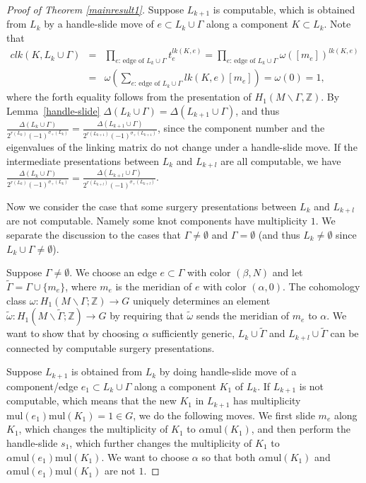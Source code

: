 \documentclass[12pt]{amsart}
\begin{document}
\begin{proof}[Proof of Theorem \ref{mainresult1}]
Suppose $L_{k+1}$ is computable, which is obtained from $L_k$ by a handle-slide move of $e\subset L_k\cup \Gamma$ along a component $K\subset L_k$. Note that 
\begin{eqnarray*}
\displaystyle clk(K, L_k\cup \Gamma)&=&\prod_{\text{$e$: edge of $L_k\cup \Gamma$}} t_e^{lk(K, e)}=\prod_{\text{$e$: edge of $L_k\cup \Gamma$}} \omega ([m_e])^{lk(K, e)}\\&=&\omega\left (\sum_{\text{$e$: edge of $L_k\cup \Gamma$}} lk(K, e) [m_e]\right )=\omega (0)=1,
\end{eqnarray*}
where the forth equality follows from the presentation of $H_1(M\backslash \Gamma, \mathbb{Z})$. By Lemma~\ref{handle-slide} $\Delta (L_k\cup \Gamma)=\Delta (L_{k+1}\cup \Gamma)$, and thus $\frac{\Delta (L_k\cup \Gamma)}{2^{r(L_k)}(-1)^{\sigma_+(L_k)}}=\frac{\Delta (L_{k+1}\cup \Gamma)}{2^{r(L_{k+1})}(-1)^{\sigma_+(L_{k+1})}}$, since the component number and the eigenvalues of the linking matrix do not change under a handle-slide move.
If the intermediate presentations between $L_k$ and $L_{k+l}$ are all computable, we have $\frac{\Delta (L_k\cup \Gamma)}{2^{r(L_k)}(-1)^{\sigma_+(L_k)}}=\frac{\Delta (L_{k+l}\cup \Gamma)}{2^{r(L_{k+l})}(-1)^{\sigma_+(L_{k+l})}}$.

Now we consider the case that some surgery presentations between $L_k$ and $L_{k+l}$ are not computable. Namely some knot components have multiplicity $1$. We separate the discussion to the cases that $\Gamma\neq \emptyset$ and $\Gamma= \emptyset$ (and thus $L_k\neq \emptyset$ since $L_k\cup \Gamma\neq \emptyset$).

Suppose $\Gamma\neq \emptyset$. We choose an edge $e\subset \Gamma$ with color $(\beta, N)$ and let $\tilde{\Gamma}=\Gamma\cup \{m_e\}$, where $m_e$ is the meridian of $e$ with color $(\alpha, 0)$. The cohomology class $\omega: H_1(M\backslash \Gamma; \mathbb{Z})\to G$ uniquely determines an element $\tilde{\omega}: H_1(M\backslash \tilde{\Gamma}; \mathbb{Z})\to G$ by requiring that $\tilde{\omega}$ sends the meridian of $m_e$ to $\alpha$. We want to show that by choosing $\alpha$ sufficiently generic, $L_k\cup \tilde{\Gamma}$ and $L_{k+l}\cup \tilde{\Gamma}$ can be connected by computable surgery presentations.

Suppose $L_{k+1}$ is obtained from $L_k$ by doing handle-slide move of a component/edge $e_1\subset L_k\cup \Gamma$ along a component $K_1$ of $L_k$. If $L_{k+1}$ is not computable, which means that the new $K_1$ in $L_{k+1}$ has multiplicity $\mathrm{mul}(e_1)\mathrm{mul}(K_1)=1\in G$, we do the following moves. We first slide $m_e$ along $K_1$, which changes the multiplicity of $K_1$ to $\alpha \mathrm{mul}(K_1)$, and then perform the handle-slide $s_1$, which further changes the multiplicity of $K_1$ to $\alpha\mathrm{mul}(e_1)\mathrm{mul}(K_1)$. We want to choose $\alpha$ so that both $\alpha \mathrm{mul}(K_1)$ and $\alpha\mathrm{mul}(e_1)\mathrm{mul}(K_1)$ are not $1$.


\end{proof}
\end{document}
